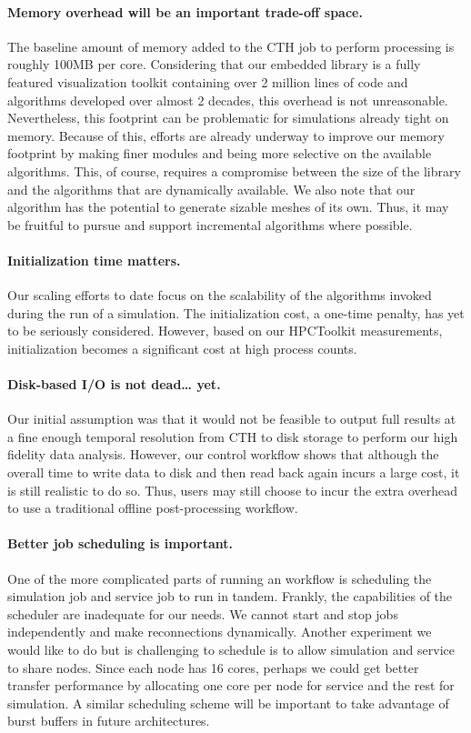 \paragraph{Memory overhead will be an important trade-off space.}
The baseline amount of memory added to the CTH job to perform \insitu
processing is roughly 100MB per core.  Considering that our embedded
\insitu library is a fully featured visualization toolkit containing over 2
million lines of code and algorithms developed over almost 2 decades, this
overhead is not unreasonable.  Nevertheless, this footprint can be
problematic for simulations already tight on memory.  Because of this,
efforts are already underway to improve our memory footprint by making
finer modules and being more selective on the available algorithms.  This,
of course, requires a compromise between the size of the library and the
algorithms that are dynamically available.  We also note that our algorithm
has the potential to generate sizable meshes of its own.  Thus, it may be
fruitful to pursue and support incremental algorithms where possible.

\paragraph{Initialization time matters.}  Our scaling efforts to date
focus on the scalability of the algorithms invoked during the run of a
simulation.  The initialization cost, a one-time penalty, has yet to be
seriously considered.  However, based on our HPCToolkit measurements,
initialization becomes a significant cost at high process counts.

\paragraph{Disk-based I/O is not dead\ldots{} yet.} Our initial assumption
was that it would not be feasible to output full results at a fine enough
temporal resolution from CTH to disk storage to perform our high fidelity
data analysis.  However, our control workflow shows that although the overall
time to write data to disk and then read back again incurs a large cost, it
is still realistic to do so.  Thus, users may still choose to incur the
extra overhead to use a traditional offline post-processing \vda workflow.

\paragraph{Better job scheduling is important.} One of the more complicated
parts of running an \intransit workflow is scheduling the simulation job
and service job to run in tandem.  Frankly, the capabilities of the
scheduler are inadequate for our needs.  We cannot start and stop jobs
independently and make reconnections dynamically.  Another experiment we
would like to do but is challenging to schedule is to allow simulation and
service to share nodes.  Since each node has 16 cores, perhaps we could get
better transfer performance by allocating one core per node for service and
the rest for simulation.  A similar scheduling scheme will be important to
take advantage of burst buffers in future architectures.

